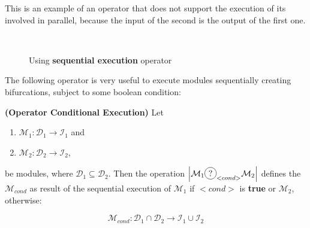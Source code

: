 This is an example of an operator that does not support the execution of its involved \cms{} in parallel, because the input of the second \cm{} is the output of the first one.


\begin{figure}[h]
	\centering
	\hspace{0.05\linewidth}
	\\
	\caption[]{Using {\bf sequential execution} operator}
	\label{fig:seq_example}
\end{figure}

The following operator is very useful to execute modules sequentially creating bifurcations, subject to some boolean condition:

\begin{definition}\label{op:conditional}
{\bf (Operator Conditional Execution)} Let
\begin{enumerate}%
	\item $\mathcal{M}_1 : \mathcal{D}_1 \rightarrow \mathcal{I}_1$ and  
	\item $\mathcal{M}_2 : \mathcal{D}_2 \rightarrow \mathcal{I}_2$,
\end{enumerate}%
be modules, where $\mathcal{D}_1 \subseteq \mathcal{D}_2$. %
Then the operation $\left|\mathcal{M}_1\circled{?}_{<cond>}\mathcal{M}_2\right|$ defines the \cm{} $\mathcal{M}_{cond}$ as result of the sequential execution of $\mathcal{M}_1$ if $<cond>$ is {\bf true} or $\mathcal{M}_2$, otherwise:

\[
\mathcal{M}_{cond}:\mathcal{D}_1\cap\mathcal{D}_2 \rightarrow \mathcal{I}_1 \cup \mathcal{I}_2 
\]
\end{definition}

